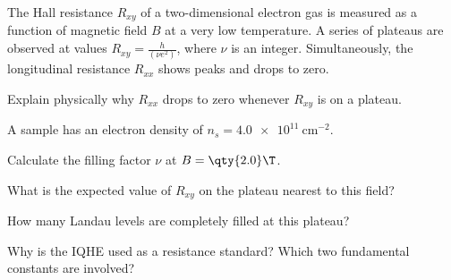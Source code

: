 \begin{problem}
  The Hall resistance $R_{xy}$ of a two-dimensional electron gas is measured as
  a function of magnetic field $B$ at a very low temperature. A series of
  plateaus are observed at values $R_{xy} = \frac{h}{(\nu e^2)}$, where $\nu$ is
  an integer. Simultaneously, the longitudinal resistance $R_{xx}$ shows peaks
  and drops to zero.
  \begin{enumext}
    \item Explain physically why $R_{xx}$ drops to zero whenever $R_{xy}$ is on
    a plateau.
    \item A sample has an electron density of $n_s = \qty{4.0e11}{\cm^{-2}}$.
    \begin{enumext}
      \item Calculate the filling factor $\nu$ at $B = \qty{2.0}\T$.
      \item What is the expected value of $R_{xy}$ on the plateau nearest to
      this field?
      \item How many Landau levels are completely filled at this plateau?
    \end{enumext}
    \item Why is the IQHE used as a resistance standard? Which two fundamental
    constants are involved?
  \end{enumext}
\end{problem}
